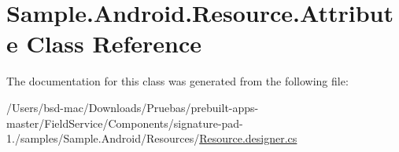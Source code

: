 \hypertarget{class_sample_1_1_android_1_1_resource_1_1_attribute}{\section{Sample.\+Android.\+Resource.\+Attribute Class Reference}
\label{class_sample_1_1_android_1_1_resource_1_1_attribute}
}


The documentation for this class was generated from the following file\+:\begin{DoxyCompactItemize}
\item 
/\+Users/bsd-\/mac/\+Downloads/\+Pruebas/prebuilt-\/apps-\/master/\+Field\+Service/\+Components/signature-\/pad-\/1./samples/\+Sample.\+Android/\+Resources/\hyperlink{_components_2signature-pad-1_82_2samples_2_sample_8_android_2_resources_2_resource_8designer_8cs}{Resource.\+designer.\+cs}\end{DoxyCompactItemize}
